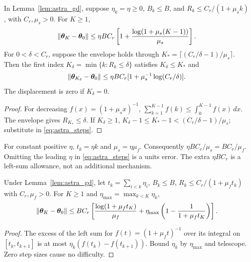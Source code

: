 \begin{corollary}
\label{cor:astra_steps}
In Lemma~\ref{lem:astra_gd}, suppose $\eta_k=\eta\ge0$, $B_k\le B$,
and $R_k\le C_r/(1+\mu_s k)$, with $C_r,\mu_s>0$.
For $K\ge1$,
\begin{equation}\label{eq:astra_steps}
 \|{\boldsymbol{\theta}}_K-{\boldsymbol{\theta}}_0\|
 \le\eta BC_r\left[1+\frac{\log(1+\mu_s(K-1))}{\mu_s}\right].
\end{equation}
For $0<\delta<C_r$, suppose the envelope holds through
$K_* =\lceil(C_r/\delta-1)/\mu_s\rceil$. Then the first index
$K_\delta=\min\{k:R_k\le\delta\}$ satisfies $K_\delta\le K_*$ and
\begin{equation}\label{eq:astra_hit}
 \|{\boldsymbol{\theta}}_{K_\delta}-{\boldsymbol{\theta}}_0\|
 \le\eta BC_r[1+\mu_s^{-1}\log(C_r/\delta)].
\end{equation}
The displacement is zero if $K_\delta=0$.
\end{corollary}
\begin{proof}
For decreasing $f(x)=(1+\mu_sx)^{-1}$,
$\sum_{k=1}^{K-1}f(k)\le\int_0^{K-1}f(x)\,dx$.
The envelope gives $R_{K_*}\le\delta$. If $K_\delta\ge1$,
$K_\delta-1\le K_*-1<(C_r/\delta-1)/\mu_s$; substitute in
\eqref{eq:astra_steps}.
\end{proof}
\begin{remark}
For constant positive $\eta$, $t_k=\eta k$ and $\mu_s=\eta\mu_f$.
Consequently $\eta BC_r/\mu_s=BC_r/\mu_f$. Omitting the leading
$\eta$ in \eqref{eq:astra_steps} is a units error. The extra
$\eta BC_r$ is a left-sum allowance, not an additional mechanism.
\end{remark}

\begin{lemma}
\label{lem:astra_variable}
Under Lemma~\ref{lem:astra_gd}, let $t_k=\sum_{i<k}\eta_i$,
$B_k\le B$, $R_k\le C_r/(1+\mu_ft_k)$ with $C_r,\mu_f>0$.
For $K\ge1$ and $\eta_{\max}=\max_{k<K}\eta_k$,
\begin{equation}\label{eq:astra_variable}
 \|{\boldsymbol{\theta}}_K-{\boldsymbol{\theta}}_0\|\le BC_r\left[
 \frac{\log(1+\mu_ft_K)}{\mu_f}
 +\eta_{\max}\left(1-\frac1{1+\mu_ft_K}\right)\right].
\end{equation}
\end{lemma}
\begin{proof}
The excess of the left sum for $f(t)=(1+\mu_ft)^{-1}$ over its
integral on $[t_k,t_{k+1}]$ is at most
$\eta_k(f(t_k)-f(t_{k+1}))$. Bound $\eta_k$ by $\eta_{\max}$ and
telescope. Zero step sizes cause no difficulty.
\end{proof}


